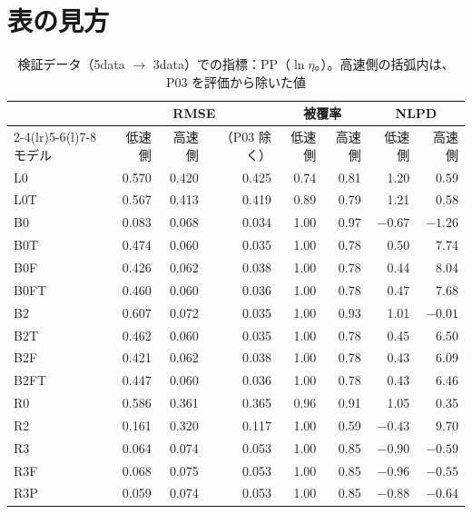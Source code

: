 \documentclass[paper=a4paper,fontsize=10.5pt,line_length=44zw,number_of_lines=38]{jlreq}
\newcommand{\file}[1]{\texttt{\detokenize{#1}}}
\begin{document}
\section{表の見方}

\begin{table}[H]
\caption{検証データ（5data $\to$ 3data）での指標：PP（$\ln\eta$。\file{metrics.csv}）。高速側の括弧内は、P03 を評価から除いた値}\label{tab:sv_pp}
\begin{tabularx}{\linewidth}{@{}l*{7}{r}@{}}
\toprule
 & \multicolumn{3}{c}{RMSE} & \multicolumn{2}{c}{被覆率} & \multicolumn{2}{c}{NLPD} \\
\cmidrule(lr){2-4}\cmidrule(lr){5-6}\cmidrule(l){7-8}
モデル & 低速側 & 高速側 & （P03 除く） & 低速側 & 高速側 & 低速側 & 高速側 \\
\midrule
L0 & 0.570 & 0.420 & 0.425 & 0.74 & 0.81 & 1.20 & 0.59 \\
L0T & 0.567 & 0.413 & 0.419 & 0.89 & 0.79 & 1.21 & 0.58 \\
B0 & 0.083 & 0.068 & 0.034 & 1.00 & 0.97 & $-0.67$ & $-1.26$ \\
B0T & 0.474 & 0.060 & 0.035 & 1.00 & 0.78 & 0.50 & 7.74 \\
B0F & 0.426 & 0.062 & 0.038 & 1.00 & 0.78 & 0.44 & 8.04 \\
B0FT & 0.460 & 0.060 & 0.036 & 1.00 & 0.78 & 0.47 & 7.68 \\
B2 & 0.607 & 0.072 & 0.035 & 1.00 & 0.93 & 1.01 & $-0.01$ \\
B2T & 0.462 & 0.060 & 0.035 & 1.00 & 0.78 & 0.45 & 6.50 \\
B2F & 0.421 & 0.062 & 0.038 & 1.00 & 0.78 & 0.43 & 6.09 \\
B2FT & 0.447 & 0.060 & 0.036 & 1.00 & 0.78 & 0.43 & 6.46 \\
R0 & 0.586 & 0.361 & 0.365 & 0.96 & 0.91 & 1.05 & 0.35 \\
R2 & 0.161 & 0.320 & 0.117 & 1.00 & 0.59 & $-0.43$ & 9.70 \\
R3 & 0.064 & 0.074 & 0.053 & 1.00 & 0.85 & $-0.90$ & $-0.59$ \\
R3F & 0.068 & 0.075 & 0.053 & 1.00 & 0.85 & $-0.96$ & $-0.55$ \\
R3P & 0.059 & 0.074 & 0.053 & 1.00 & 0.85 & $-0.88$ & $-0.64$ \\
\bottomrule
\end{tabularx}
\end{table}
\end{document}
